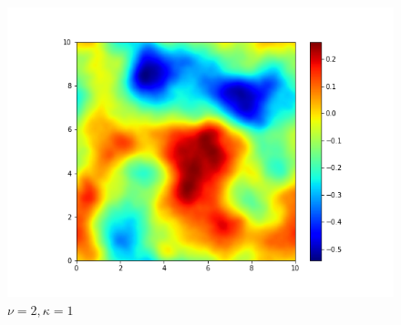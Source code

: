 \documentclass{article}
\begin{document}
\begin{figure}[H]
\begin{minipage}[t]{0.3\textwidth}
    \caption*{$\nu=1, \kappa=1$}
  \end{minipage}
  \begin{minipage}[t]{0.3\textwidth}
    \centering
    \includegraphics[width=\textwidth]{./pics/2D_RF_256_10.0_2_1.png}  %
    \caption*{$\nu=2, \kappa=1$}
  \end{minipage}


\end{figure}
\end{document}
